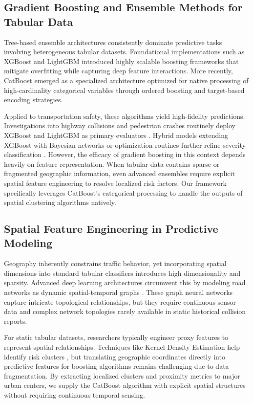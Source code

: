 \documentclass[runningheads]{llncs}
\begin{document}
\subsection{Gradient Boosting and Ensemble Methods for Tabular Data}
Tree-based ensemble architectures consistently dominate predictive tasks involving heterogeneous tabular datasets. Foundational implementations such as XGBoost \cite{chen2016} and LightGBM \cite{ke2017} introduced highly scalable boosting frameworks that mitigate overfitting while capturing deep feature interactions. More recently, CatBoost \cite{prokhorenkova2017} emerged as a specialized architecture optimized for native processing of high-cardinality categorical variables through ordered boosting and target-based encoding strategies.

Applied to transportation safety, these algorithms yield high-fidelity predictions. Investigations into highway collisions and pedestrian crashes routinely deploy XGBoost and LightGBM as primary evaluators \cite{guo2021,lee2020,li2022,wu2021}. Hybrid models extending XGBoost with Bayesian networks or optimization routines further refine severity classification \cite{chen2025,yang2022}. However, the efficacy of gradient boosting in this context depends heavily on feature representation. When tabular data contains sparse or fragmented geographic information, even advanced ensembles require explicit spatial feature engineering to resolve localized risk factors. Our framework specifically leverages CatBoost's categorical processing to handle the outputs of spatial clustering algorithms natively.

\subsection{Spatial Feature Engineering in Predictive Modeling}
Geography inherently constrains traffic behavior, yet incorporating spatial dimensions into standard tabular classifiers introduces high dimensionality and sparsity. Advanced deep learning architectures circumvent this by modeling road networks as dynamic spatial-temporal graphs \cite{diao2019,shao2022}. These graph neural networks capture intricate topological relationships, but they require continuous sensor data and complex network topologies rarely available in static historical collision reports.

For static tabular datasets, researchers typically engineer proxy features to represent spatial relationships. Techniques like Kernel Density Estimation help identify risk clusters \cite{kazmi2020}, but translating geographic coordinates directly into predictive features for boosting algorithms remains challenging due to data fragmentation. By extracting localized clusters and proximity metrics to major urban centers, we supply the CatBoost algorithm with explicit spatial structures without requiring continuous temporal sensing.
\end{document}
